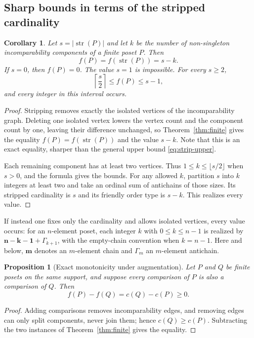 \documentclass[11pt,letterpaper]{article}
\newtheorem{proposition}[theorem]{Proposition}
\newtheorem{corollary}[theorem]{Corollary}
\theoremstyle{definition}
\theoremstyle{remark}
\newcommand{\str}{\operatorname{str}}
\newcommand{\chain}[1]{\mathbf{#1}}
\newcommand{\anti}[1]{\Gamma_{#1}}
\begin{document}
\subsection{Sharp bounds in terms of the stripped cardinality}

\begin{corollary}\label{cor:finite-strip}
Let $s=|\str(P)|$ and let $k$ be the number of non-singleton
incomparability components of a finite poset $P$. Then
\begin{equation}\label{eq:strip-equality}
 f(P)=f(\str(P))=s-k.
\end{equation}
If $s=0$, then $f(P)=0$. The value $s=1$ is impossible. For every $s\ge2$,
\begin{equation}\label{eq:sharp-finite-bounds}
 \left\lceil\frac{s}{2}\right\rceil\le f(P)\le s-1,
\end{equation}
and every integer in this interval occurs.
\end{corollary}
\begin{proof}
Stripping removes exactly the isolated vertices of the incomparability
graph. Deleting one isolated vertex lowers the vertex count and the
component count by one, leaving their difference unchanged, so
Theorem~\ref{thm:finite} gives the equality $f(P)=f(\str(P))$ and the value
$s-k$. Note that this is an exact equality, sharper than the general upper
bound \eqref{eq:strip-upper}.

Each remaining component has at least two vertices. Thus
$1\le k\le\lfloor s/2\rfloor$ when $s>0$, and the formula gives the bounds.
For any allowed $k$, partition $s$ into $k$ integers at least two and take
an ordinal sum of antichains of those sizes. Its stripped cardinality is
$s$ and its friendly order type is $s-k$. This realizes every value.
\end{proof}

If instead one fixes only the cardinality and allows isolated vertices,
every value occurs: for an $n$-element poset, each integer $k$ with
$0\le k\le n-1$ is realized by $\chain{n-k-1}+\anti{k+1}$, with the
empty-chain convention when $k=n-1$. Here and below, $\chain m$ denotes an
$m$-element chain and $\anti m$ an $m$-element antichain.

\begin{proposition}[Exact monotonicity under augmentation]\label{prop:augment}
Let $P$ and $Q$ be finite posets on the same support, and suppose every
comparison of $P$ is also a comparison of $Q$. Then
\[
 f(P)-f(Q)=c(Q)-c(P)\ge0.
\]
\end{proposition}
\begin{proof}
Adding comparisons removes incomparability edges, and removing edges can
only split components, never join them; hence $c(Q)\ge c(P)$. Subtracting
the two instances of Theorem~\ref{thm:finite} gives the equality.
\end{proof}
\end{document}
